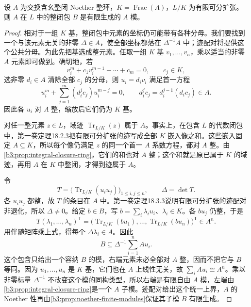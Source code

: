 \begin{lemma}\label{b3:lem:normalization-separable-finite}
	设 \(A\) 为交换含幺整闭 Noether 整环，\(K=\operatorname{Frac}(A)\)，\(L/K\) 为有限可分扩张。则 \(A\) 在 \(L\) 中的整闭包 \(B\) 是有限生成的 \(A\) 模。
\end{lemma}
\begin{proof}
	相对于一组 \(K\) 基，整闭包中元素的坐标仍可能带有各种分母。我们要找到一个与该元素无关的非零 \(\Delta\in A\)，使全部坐标都落在 \(\Delta^{-1}A\) 中；迹配对将提供这个公共分母。为此先把基选成整元素。任取一组 \(K\) 基 \(v_1,\ldots,v_n\)，乘以适当的非零 \(A\) 元素即可做到。确切地，若
	\[
		v_i^m+c_1v_i^{m-1}+\cdots+c_m=0,\qquad c_j\in K,
	\]
	选非零 \(d_i\in A\) 清除全部 \(c_j\) 的分母，则 \(u_i=d_iv_i\) 满足首一方程
	\[
		u_i^m+\sum_{j=1}^m(d_i^jc_j)u_i^{m-j}=0, \qquad d_i^jc_j=d_i^{j-1}(d_ic_j)\in A.
	\]
	因此各 \(u_i\) 对 \(A\) 整，缩放后它们仍为 \(K\) 基。

	对任一整元素 \(z\in L\)，域迹 \(\operatorname{Tr}_{L/K}(z)\) 属于 \(A\)。事实上，在包含 \(L\) 的代数闭包中，第一卷定理18.2.3把有限可分扩张的迹写成全部 \(K\) 嵌入像之和。这些嵌入固定 \(A\subseteq K\)，所以每个像仍满足 \(z\) 的同一个首一 \(A\) 系数方程，都对 \(A\) 整。由\cref{b3:prop:integral-closure-ring}，它们的和也对 \(A\) 整；这个和就是原已属于 \(K\) 的域迹，再用 \(A\) 在 \(K\) 中整闭，才得到迹属于 \(A\)。

	令
	\[
		T=\bigl(\operatorname{Tr}_{L/K}(u_i u_j)\bigr)_{1\le i,j\le n}, \qquad \Delta=\det T.
	\]
	各 \(u_i u_j\) 都整，故 \(T\) 的条目在 \(A\) 中。第一卷定理18.3.3说明有限可分扩张的迹配对非退化，所以 \(\Delta\ne0\)。给定 \(b\in B\)，写 \(b=\sum_i\lambda_i u_i\)、\(\lambda_i\in K\)。各 \(bu_j\) 仍整，于是
	\[
		T(\lambda_1,\ldots,\lambda_n)^{\mathsf T} =\bigl(\operatorname{Tr}_{L/K}(bu_1),\ldots, \operatorname{Tr}_{L/K}(bu_n)\bigr)^{\mathsf T}\in A^n.
	\]
	用伴随矩阵乘上式，得每个 \(\Delta\lambda_i\in A\)。因此
	\begin{equation}\label{b3:eq:normalization-trace-denominator}
		B\subseteq\Delta^{-1}\sum_{i=1}^nAu_i.
	\end{equation}
	这个包含只给出一个容纳 \(B\) 的模，右端元素未必全部对 \(A\) 整，因而不把它与 \(B\) 等同。因为 \(u_1,\ldots,u_n\) 是 \(K\) 基，它们也在 \(A\) 上线性无关，故 \(\sum_iAu_i\cong A^n\)。乘以非零标量 \(\Delta^{-1}\) 不改变这个模的同构类型，所以右端是有限自由 \(A\) 模，左端由\cref{b3:prop:integral-closure-ring}是一个 \(A\) 子模。迹配对给出这个统一上界，\(A\) 的 Noether 性再由\cref{b3:prop:noether-finite-modules}保证其子模 \(B\) 有限生成。
\end{proof}

